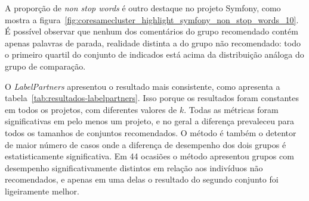 \documentclass[12pt,openany,oneside,a4paper,english,brazil]{abntbibufjf}
\begin{document}
A proporção de \textit{non stop words} é outro destaque no projeto Symfony, como mostra a figura~\ref{fig:coresamecluster_highlight_symfony_non_stop_words_10}. É possível observar que nenhum dos comentários do grupo recomendado contém apenas palavras de parada, realidade distinta a do grupo não recomendado: todo o primeiro quartil do conjunto de indicados está acima da distribuição análoga do grupo de comparação.

O \textit{LabelPartners} apresentou o resultado mais consistente, como apresenta a tabela~\ref{tab:resultados-labelpartners}. Isso porque os resultados foram constantes em todos os projetos, com diferentes valores de $k$. Todas as métricas foram significativas em pelo menos um projeto, e no geral a diferença prevaleceu para todos os tamanhos de conjuntos recomendados. O método é também o detentor de maior número de casos onde a diferença de desempenho dos dois grupos é estatisticamente significativa. Em 44 ocasiões o método apresentou grupos com desempenho significativamente distintos em relação aos indivíduos não recomendados, e apenas em uma delas o resultado do segundo conjunto foi ligeiramente melhor.
\end{document}
